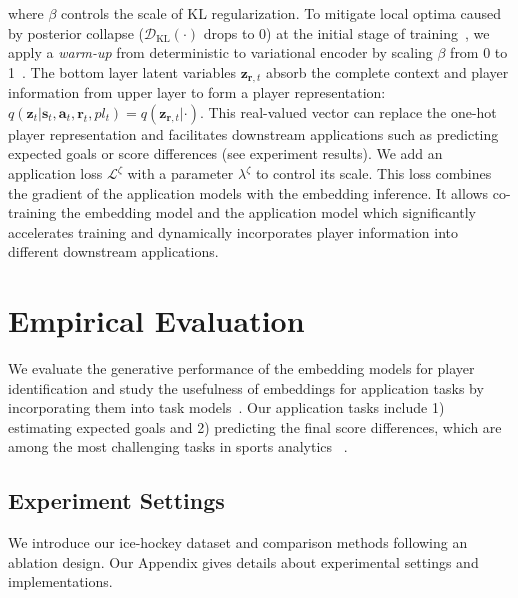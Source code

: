 \documentclass[letterpaper]{article} %
\newcommand{\latentvariables}{\mathbf{z}}
\newcommand{\state}{\mathbf{s}}
\newcommand{\action}{\mathbf{a}}
\newcommand{\reward}{\boldsymbol{r}}
\newcommand{\player}{pl}
\begin{document}
where $\beta$ controls the scale of KL regularization. To mitigate local optima caused by posterior collapse ($\mathcal{D}_\text{KL}(\cdot)$ drops to $0$) at the initial stage of training~\cite{HePosteriorCollapse19}, we apply a {\it warm-up} from deterministic to variational encoder by scaling $\beta$ from 0 to 1~\cite{SonderbyLadderVAE16}.
The bottom layer latent variables $\latentvariables_{\reward,t}$ absorb the complete context and player information from upper layer to form a player representation: $q(\latentvariables_{t}|
\state_{t},\action_{t},\reward_{t},\player_{t})=q(\latentvariables_{\reward,t}|\cdot)$. This real-valued vector can replace the one-hot player representation and facilitates downstream applications such as predicting expected goals or score differences (see experiment results).
We add an application loss $\mathcal{L}^{\zeta}$ with a parameter $\lambda^{\zeta}$ to control its scale. This loss combines the gradient of the application models with the embedding inference. It allows co-training the embedding model and the application model which significantly accelerates training and  dynamically incorporates player information into different downstream applications. 

\section{Empirical Evaluation} 

We evaluate the generative performance of the embedding models for player identification 
and study the usefulness of embeddings for application tasks by incorporating them  into task models~\cite{PetersNIGCLZ18,AkbikBV18}.
Our application tasks include 1) estimating expected goals and 2) predicting the final score differences, which are among the most challenging tasks in sports analytics %
~\cite{Macdonald2012,ganguly2018problem}.



\subsection{Experiment Settings}
We introduce our ice-hockey dataset and comparison methods following an ablation design. Our Appendix gives details about experimental settings and implementations. 
\end{document}

